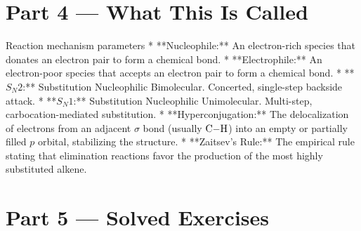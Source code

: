 \documentclass[12pt, a4paper]{book}
\begin{document}
\newpage

\section{Part 4 --- What This Is Called}

\begin{namedconcept}{Reaction mechanism parameters}
* **Nucleophile:** An electron-rich species that donates an electron pair to form a chemical bond.
* **Electrophile:** An electron-poor species that accepts an electron pair to form a chemical bond.
* **$S_N2$:** Substitution Nucleophilic Bimolecular. Concerted, single-step backside attack.
* **$S_N1$:** Substitution Nucleophilic Unimolecular. Multi-step, carbocation-mediated substitution.
* **Hyperconjugation:** The delocalization of electrons from an adjacent $\sigma$ bond (usually $\ce{C-H}$) into an empty or partially filled $p$ orbital, stabilizing the structure.
* **Zaitsev's Rule:** The empirical rule stating that elimination reactions favor the production of the most highly substituted alkene.
\end{namedconcept}

\newpage

\section{Part 5 --- Solved Exercises}
\end{document}
